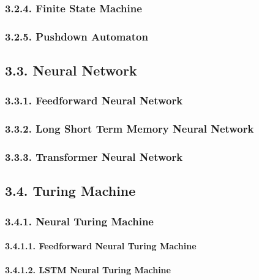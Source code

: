 \documentclass[]{article}
\let\oldparagraph\paragraph
\renewcommand{\paragraph}[1]{\oldparagraph{#1}\mbox{}}
\begin{document}
\subsubsection{3.2.4. Finite State Machine}\label{finite-state-machine}

\subsubsection{3.2.5. Pushdown Automaton}\label{pushdown-automaton}

\subsection{3.3. Neural Network}\label{neural-network}

\subsubsection{3.3.1. Feedforward Neural
Network}\label{feedforward-neural-network}

\subsubsection{3.3.2. Long Short Term Memory Neural
Network}\label{long-short-term-memory-neural-network}

\subsubsection{3.3.3. Transformer Neural
Network}\label{transformer-neural-network}

\subsection{3.4. Turing Machine}\label{turing-machine}

\subsubsection{3.4.1. Neural Turing
Machine}\label{neural-turing-machine}

\paragraph{3.4.1.1. Feedforward Neural Turing
Machine}\label{feedforward-neural-turing-machine}

\paragraph{3.4.1.2. LSTM Neural Turing
Machine}\label{lstm-neural-turing-machine}
\end{document}
